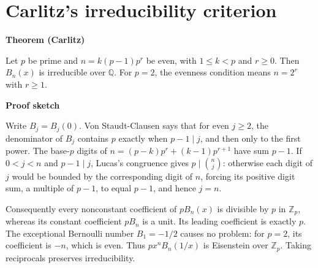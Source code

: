 \documentclass[11pt,a4paper,oneside,openany]{book}
\begin{document}
\section{Carlitz's irreducibility criterion}

\begin{atlasblock}[standard]
\textbf{\sffamily Theorem (Carlitz)}\par\smallskip
\color{black} Let \(p\) be prime and \(n=k(p-1)p^r\) be even, with \(1\le k<p\) and \(r\ge0\). Then \(B_n(x)\) is irreducible over \(\mathbb Q\). For \(p=2\), the evenness condition means \(n=2^r\) with \(r\ge1\).\par
\end{atlasblock}\color{black}

\begin{atlasblock}[standard]
\textbf{\sffamily Proof sketch}\par\smallskip
\color{black} Write \(B_j=B_j(0)\). Von Staudt-Clausen says that for even \(j\ge2\), the denominator of \(B_j\) contains \(p\) exactly when \(p-1\mid j\), and then only to the first power. The base-\(p\) digits of \(n=(p-k)p^r+(k-1)p^{r+1}\) have sum \(p-1\). If \(0<j<n\) and \(p-1\mid j\), Lucas's congruence gives \(p\mid\binom nj\): otherwise each digit of \(j\) would be bounded by the corresponding digit of \(n\), forcing its positive digit sum, a multiple of \(p-1\), to equal \(p-1\), and hence \(j=n\).\par
\color{black} Consequently every nonconstant coefficient of \(pB_n(x)\) is divisible by \(p\) in \(\mathbb Z_p\), whereas its constant coefficient \(pB_n\) is a unit. Its leading coefficient is exactly \(p\). The exceptional Bernoulli number \(B_1=-1/2\) causes no problem: for \(p=2\), its coefficient is \(-n\), which is even. Thus \(px^nB_n(1/x)\) is Eisenstein over \(\mathbb Z_p\). Taking reciprocals preserves irreducibility.\par
\end{atlasblock}\color{black}
\end{document}

